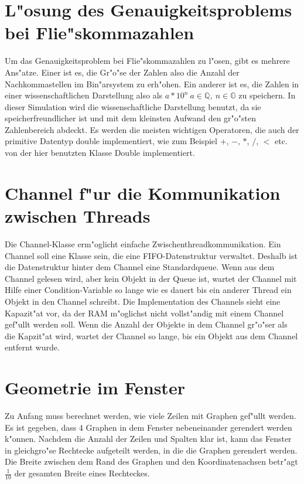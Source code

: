 \documentclass[14pt, a4paper]{report}
\begin{document}
\section{L"osung des Genauigkeitsproblems bei Flie"skommazahlen}
Um das Genauigkeitsproblem bei Flie"skommazahlen zu l"osen, gibt es mehrere Ans"atze.
Einer ist es, die Gr"o"se der Zahlen also die Anzahl der Nachkommastellen im
Bin"arsystem zu erh"ohen. Ein anderer ist es, die Zahlen in einer wissenschaftlichen
Darstellung also als $a * 10^n ~ a \in \mathbb Q, ~ n \in \mathbb G$ zu speichern. In
dieser Simulation wird die wissenschaftliche Darstellung benutzt, da sie 
speicherfreundlicher ist und mit dem kleinsten Aufwand den gr"o"sten Zahlenbereich
abdeckt. Es werden die meisten wichtigen Operatoren, die auch der primitive Datentyp double 
implementiert, wie zum Beispiel $+$, $-$, $*$, $/$, $<$ etc. von der hier benutzten Klasse Double
implementiert.

\section{Channel f"ur die Kommunikation zwischen Threads}
Die Channel-Klasse erm"oglicht einfache Zwischenthreadkommunikation. Ein Channel soll
eine Klasse sein, die eine FIFO-Datenstruktur verwaltet. Deshalb ist die Datenstruktur
hinter dem Channel eine Standardqueue. Wenn aus dem Channel gelesen wird, aber kein 
Objekt in der Queue ist, wartet der Channel mit Hilfe einer Condition-Variable so lange 
wie es dauert bis ein anderer
Thread ein Objekt in den Channel schreibt. Die Implementation des Channels sieht
eine Kapazit"at vor, da der RAM m"oglichst nicht vollst"andig mit einem Channel
gef"ullt werden soll.
Wenn die Anzahl der Objekte in dem Channel gr"o"ser als die Kapzit"at wird, wartet der 
Channel so lange, bis ein Objekt aus dem Channel entfernt wurde.

\section{Geometrie im Fenster}
Zu Anfang muss berechnet werden, wie viele Zeilen mit Graphen gef"ullt werden. Es ist
gegeben, dass 4 Graphen in dem Fenster nebeneinander gerendert werden k"onnen. 
Nachdem die 
Anzahl der Zeilen und Spalten klar ist, kann das Fenster in gleichgro"se Rechtecke
aufgeteilt werden, in die die Graphen gerendert werden. Die Breite zwischen dem Rand des 
Graphen und den Koordinatenachsen betr"agt $\frac{1}{10}$ der gesamten Breite eines
Rechteckes.
\end{document}
